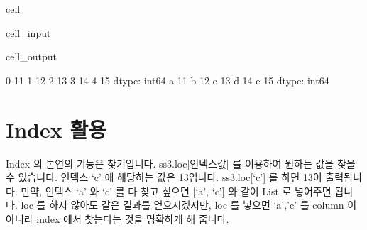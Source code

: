 \documentclass[letterpaper,10pt,english]{jupyterBook}
\begin{document}
\begin{sphinxuseclass}{cell}\begin{sphinxVerbatimInput}

\begin{sphinxuseclass}{cell_input}
\begin{sphinxVerbatim}[commandchars=\\\{\}]
   

  \PYG{p}{[}\PYG{p}{]}
  

   \PYG{p}{[}    \PYG{p}{]}
\end{sphinxVerbatim}

\end{sphinxuseclass}\end{sphinxVerbatimInput}
\begin{sphinxVerbatimOutput}

\begin{sphinxuseclass}{cell_output}
\begin{sphinxVerbatim}[commandchars=\\\{\}]
0    11
1    12
2    13
3    14
4    15
dtype: int64
a    11
b    12
c    13
d    14
e    15
dtype: int64
\end{sphinxVerbatim}

\end{sphinxuseclass}\end{sphinxVerbatimOutput}

\end{sphinxuseclass}

\section{Index 활용}
\label{\detokenize{chapter2/2.1.2_Python_Basics:id1}}
\sphinxAtStartPar
Index 의 본연의 기능은 찾기입니다. ss3.loc{[}인덱스값{]} 를 이용하여 원하는 값을 찾을 수 있습니다. 인덱스 ‘c’ 에 해당하는 값은 13입니다. ss3.loc{[}‘c’{]} 를 하면 13이 출력됩니다. 만약, 인덱스 ‘a’ 와 ‘c’ 를 다 찾고 싶으면 {[}‘a’, ‘c’{]} 와 같이 List 로 넣어주면 됩니다. loc 를 하지 않아도 같은 결과를 얻으시겠지만, loc 를 넣으면 ‘a’,’c’ 를 column 이 아니라 index 에서 찾는다는 것을 명확하게 해 줍니다.
\end{document}

